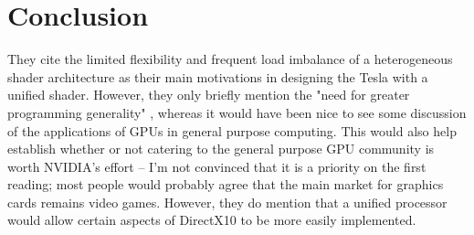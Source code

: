 \documentclass{article}
\begin{document}
\section*{Conclusion}
They cite the limited flexibility and frequent load imbalance of a heterogeneous shader architecture as their main motivations in designing the Tesla with a unified shader. However, they only briefly mention the "need for greater programming generality" \cite{Tesla}, whereas it would have been nice to see some discussion of the applications of GPUs in general purpose computing. This would also help establish whether or not catering to the general purpose GPU community is worth
NVIDIA's effort -- I'm not convinced that it is a priority on the first reading; most people would probably agree that the main market for graphics cards remains video games. However, they do mention that a unified processor would allow certain aspects of DirectX10 to be more easily implemented.




\end{document}
